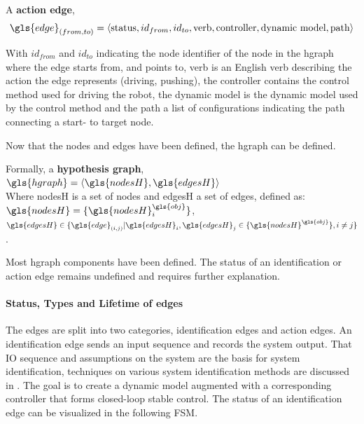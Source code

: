 A \textbf{action edge}, \[\gls{edge}_{(from, to)} = \left\langle \textrm{status}, id_{from}, id_{to}, \textrm{verb}, \textrm{controller},\textrm{dynamic model}, \textrm{path}\right\rangle\]\bs


With $id_{from}$ and $id_{to}$ indicating the node identifier of the node in the \ac{hgraph} where the edge starts from, and points to, verb is an English verb describing the action the edge represents (driving, pushing), the controller contains the control method used for driving the robot, the dynamic model is the dynamic model used by the control method and the path a list of configurations indicating the path connecting a start- to target node.\bs

Now that the nodes and edges have been defined, the \ac{hgraph} can be defined.\bs

Formally, a \textbf{hypothesis graph}, $\gls{hgraph} = \left\langle \gls{nodesH}, \gls{edgesH} \right\rangle $
\\ Where \gls{nodesH} is a set of nodes and \gls{edgesH} a set of edges, defined as: $\gls{nodesH} = \{\gls{nodesH}^{\gls{obj}}_{i}\}$, \quad $\gls{edgesH} \in \{\gls{edge}_{(i,j)}| \gls{edgesH}_i, \gls{edgesH}_j \in \{\gls{nodesH}^{\gls{obj}} \}, i \neq j\}$.\bs

Most \ac{hgraph} components have been defined. The status of an identification or action edge remains undefined and requires further explanation.\bs

\paragraph{Status, Types and Lifetime of edges}
The edges are split into two categories, identification edges and action edges. An identification edge sends an input sequence and records the system output. That \ac{IO} sequence and assumptions on the system are the basis for system identification, techniques on various system identification methods are discussed in . The goal is to create a dynamic model augmented with a corresponding controller that forms closed-loop stable control. The status of an identification edge can be visualized in the following \ac{FSM}.\bs

